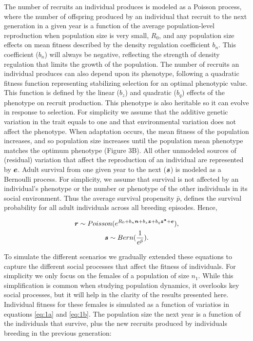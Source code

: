\documentclass{article}
\begin{document}
The number of recruits an individual produces is modeled as a Poisson process, where the number of offspring produced by an individual that recruit to the next generation in a given year is a function of the average population-level reproduction when population size is very small, $R_0$, and any population size effects on mean fitness described by the density regulation coefficient $b_{n}$. This coefficient ($b_{n}$) will always be negative, reflecting the strength of density regulation that limits the growth of the population.  The number of recruits an individual produces can also depend upon its phenotype, following a quadratic fitness function representing stabilizing selection for an optimal phenotypic value. This function is defined by the linear ($b_z$) and quadratic ($b_q$) effects of the phenotype on recruit production. This phenotype is also heritable so it can evolve in response to selection. For simplicity we assume that the additive genetic variation in the trait equals to one and that environmental variation does not affect the phenotype. When adaptation occurs, the mean fitness of the population increases, and so population size increases until the population mean phenotype matches the optimum phenotype (Figure 3B). All other unmodeled sources of (residual) variation that affect the reproduction of an individual are represented by $\vectorsym{e}$. Adult survival from one given year to the next ($\vectorsym{s}$) is modeled as a Bernoulli process. For simplicity, we assume that survival is not affected by an individual's phenotype or the number or phenotype of the other individuals in its social environment. Thus the average survival propensity $\bar{p}$, defines the survival probability for all adult individuals across all breeding episodes. Hence,

\begin{subequations} 
\begin{gather}
\vectorsym{r}\sim Poisson(e^{R_{0} + b_{n} \vectorsym{n} + b_{z} \vectorsym{z} + b_{q} \vectorsym{z^2} + \vectorsym{e}}), \label{eq:1a} \\
\vectorsym{s}\sim Bern(\frac{1}{e^{\bar{p}}}). \label{eq:1b}
\end{gather}
\end{subequations}

To simulate the different scenarios we gradually extended these equations to capture the different social processes that affect the fitness of individuals. For simplicity we only focus on the females of a population of size $n_{1}$. While this simplification is common when studying population dynamics, it overlooks key social processes, but it will help in the clarity of the results presented here. Individual fitness for these females is simulated as a function of variatios in equations \ref{eq:1a} and \ref{eq:1b}. The population size the next year is a function of the individuals that survive, plus the new recruits produced by individuals breeding in the previous generation:
\end{document}
